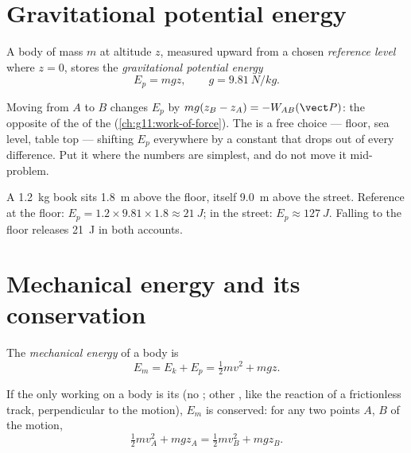 \section{Gravitational potential energy}

\begin{definition}\label{def:g11:mechanical-energy:potential}
A body of mass $m$ at altitude $z$, measured upward from a chosen
\emph{reference level} where $z = 0$, stores the
\emph{gravitational potential energy}
\[
E_p = m g z, \qquad g = \qty{9.81}{N/kg}.
\]
\end{definition}

\begin{remark}\label{rem:g11:mechanical-energy:reference}
Moving from $A$ to $B$ changes $E_p$ by $mg(z_B - z_A) =
-W_{AB}(\vect P)$: the opposite of the  of the 
(\cref{ch:g11:work-of-force}). The  is a free choice ---
floor, sea level, table top --- shifting $E_p$ everywhere by a constant
that drops out of every difference. Put it where the numbers are
simplest, and do not move it mid-problem.
\end{remark}

\begin{example}\label{ex:g11:mechanical-energy:shelf}
A \qty{1.2}{kg} book sits \qty{1.8}{m} above the floor, itself
\qty{9.0}{m} above the street. Reference at the floor:
$E_p = 1.2 \times 9.81 \times 1.8 \approx \qty{21}{J}$; in the street:
$E_p \approx \qty{127}{J}$. Falling to the floor releases \qty{21}{J} in
both accounts.
\end{example}

\section{Mechanical energy and its conservation}

\begin{definition}\label{def:g11:mechanical-energy:em}
The \emph{mechanical energy} of a body is
\[
E_m = E_k + E_p = \tfrac12 m v^2 + m g z .
\]
\end{definition}

\begin{theorem}\label{thm:g11:mechanical-energy:conservation}
If the only  working on a body is its  (no ; other
, like the reaction of a frictionless track, perpendicular to the
motion), $E_m$ is conserved: for any two points $A$, $B$ of the motion,
\[
\tfrac12 m v_A^2 + m g z_A = \tfrac12 m v_B^2 + m g z_B .
\]
\end{theorem}

